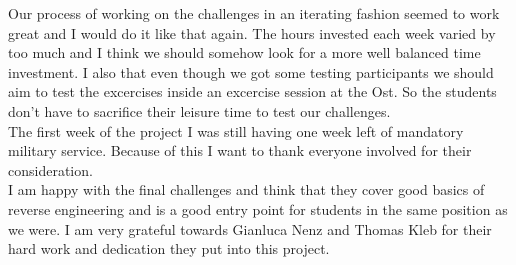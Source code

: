 Our process of working on the challenges in an iterating fashion seemed to work great and I would do it like that again. The hours invested each week varied by too much and I think we should somehow look for a more well balanced time investment. I also that even though we got some testing participants we should aim to test the excercises inside an excercise session at the Ost. So the students don't have to sacrifice their leisure time to test our challenges.\\

The first week of the project I was still having one week left of mandatory military service. Because of this I want to thank everyone involved for their consideration. \\

I am happy with the final challenges and think that they cover good basics of reverse engineering and is a good entry point for students in the same position as we were. I am very grateful towards Gianluca Nenz and Thomas Kleb for their hard work and dedication they put into this project. 
